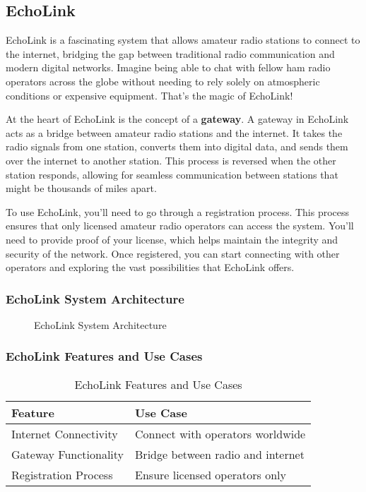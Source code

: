 \subsection{EchoLink}
\label{subsec:echolink}

EchoLink is a fascinating system that allows amateur radio stations to connect to the internet, bridging the gap between traditional radio communication and modern digital networks. Imagine being able to chat with fellow ham radio operators across the globe without needing to rely solely on atmospheric conditions or expensive equipment. That's the magic of EchoLink!

At the heart of EchoLink is the concept of a \textbf{gateway}. A gateway in EchoLink acts as a bridge between amateur radio stations and the internet. It takes the radio signals from one station, converts them into digital data, and sends them over the internet to another station. This process is reversed when the other station responds, allowing for seamless communication between stations that might be thousands of miles apart.

To use EchoLink, you'll need to go through a registration process. This process ensures that only licensed amateur radio operators can access the system. You'll need to provide proof of your license, which helps maintain the integrity and security of the network. Once registered, you can start connecting with other operators and exploring the vast possibilities that EchoLink offers.

\subsubsection*{EchoLink System Architecture}
\begin{figure}[h]
    \centering
    \caption{EchoLink System Architecture}
    \label{fig:echolink-architecture}
\end{figure}

\subsubsection*{EchoLink Features and Use Cases}
\begin{table}[h]
    \centering
    \begin{tabular}{|l|l|}
        \hline
        \textbf{Feature} & \textbf{Use Case} \\
        \hline
        Internet Connectivity & Connect with operators worldwide \\
        Gateway Functionality & Bridge between radio and internet \\
        Registration Process & Ensure licensed operators only \\
        \hline
    \end{tabular}
    \caption{EchoLink Features and Use Cases}
    \label{tab:echolink-features}
\end{table}

